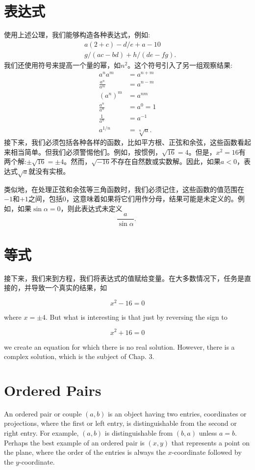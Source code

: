 \section{表达式}
使用上述公理，我们能够构造各种表达式，例如:
$$
\begin{aligned}
& a(2+c)-d / e+a-10 \\
& g /(a c-b d)+h /(d e-f g) .
\end{aligned}
$$
我们还使用符号来提高一个量的幂，如$n^{2}$。这个符号引入了另一组观察结果:
$$
\begin{aligned}
a^{n} a^{m} & =a^{n+m} \\
\frac{a^{n}}{a^{m}} & =a^{n-m} \\
\left(a^{n}\right)^{m} & =a^{n m} \\
\frac{a^{n}}{a^{n}} & =a^{0}=1 \\
\frac{1}{a^{n}} & =a^{-1} \\
a^{1 / n} & =\sqrt[n]{a} .
\end{aligned}
$$
接下来，我们必须包括各种各样的函数，比如平方根、正弦和余弦，这些函数看起来相当简单。但我们必须警惕他们。例如，按惯例，$\sqrt{16}=4$。但是，$x^{2}=16$有两个解:$\pm \sqrt{16}=\pm 4$。然而，$\sqrt{-16}$不存在自然数或实数解。因此，如果$a<0$，表达式$\sqrt{a}$就没有实根。

类似地，在处理正弦和余弦等三角函数时，我们必须记住，这些函数的值范围在$-1$和$+1$之间，包括0，这意味着如果将它们用作分母，结果可能是未定义的。例如，如果$\sin \alpha=0$，则此表达式未定义
$$
\frac{a}{\sin \alpha} \text {. }
$$

\section{等式}
接下来，我们来到方程，我们将表达式的值赋给变量。在大多数情况下，任务是直接的，并导致一个真实的结果，如


$$
x^{2}-16=0
$$

where $x=\pm 4$. But what is interesting is that just by reversing the sign to

$$
x^{2}+16=0
$$

we create an equation for which there is no real solution. However, there is a complex solution, which is the subject of Chap. 3.

\section{Ordered Pairs}
An ordered pair or couple $(a, b)$ is an object having two entries, coordinates or projections, where the first or left entry, is distinguishable from the second or right entry. For example, $(a, b)$ is distinguishable from $(b, a)$ unless $a=b$. Perhaps the best example of an ordered pair is $(x, y)$ that represents a point on the plane, where the order of the entries is always the $x$-coordinate followed by the $y$-coordinate.

